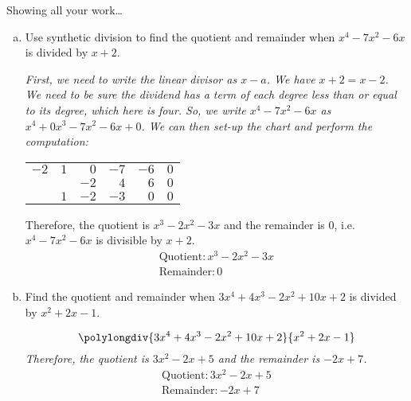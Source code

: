 \documentclass[12pt,letterpaper]{exam}
\begin{document}
\begin{questions}
Showing all your work\dots
	\begin{enumerate}[(a)]
	\item Use synthetic division to find the quotient and remainder when $x^4 - 7x^2 - 6x$ is divided by $x + 2$. \pspace
	
	{\itshape First, we need to write the linear divisor as $x - a$. We have $x + 2= x - 2$. We need to be sure the dividend has a term of each degree less than or equal to its degree, which here is four. So, we write $x^4 - 7x^2 - 6x$ as $x^4 + 0x^3 - 7x^2 - 6x + 0$. We can then set-up the chart and perform the computation: \par
		\begin{table}[h]
		\centering
		\begin{tabular}{rrrrrr}
		\multicolumn{1}{r|}{$-2$} & $1$ & $0$ & $-7$ & $-6$ & $0$ \\ \cline{1-1}
		& & $-2$ & $4$ & $6$ & $0$ \\ \hline
		& $1$ & $-2$ & $-3$ & $0$ & $0$
		\end{tabular}
		\end{table}
	Therefore, the quotient is $x^3 - 2x^2 - 3x$ and the remainder is $0$, i.e. $x^4 - 7x^2 - 6x$ is divisible by $x + 2$.
		\[
		\boxed{
		\begin{gathered}
		\text{Quotient} \colon x^3 - 2x^2 - 3x \\
		\text{Remainder} \colon 0
		\end{gathered}}
		\]
	} \pvspace{1.2cm}
		
	\item Find the quotient and remainder when $3x^4 + 4x^3 - 2x^2 + 10x + 2$ is divided by $x^2 + 2x - 1$.  
	
	{\itshape
		\[
		\polylongdiv{3x^4 + 4x^3 - 2x^2 + 10x + 2}{x^2 + 2x - 1}
		\]
	Therefore, the quotient is $3x^2 - 2x + 5$ and the remainder is $-2x + 7$.
		\[
		\boxed{
		\begin{gathered}
		\text{Quotient} \colon 3x^2 - 2x + 5 \\
		\text{Remainder} \colon -2x + 7
		\end{gathered}
		}
		\]
	}
	\end{enumerate}



\newpage
{} \par\vspace{0.3cm}


\end{questions}
\end{document}
